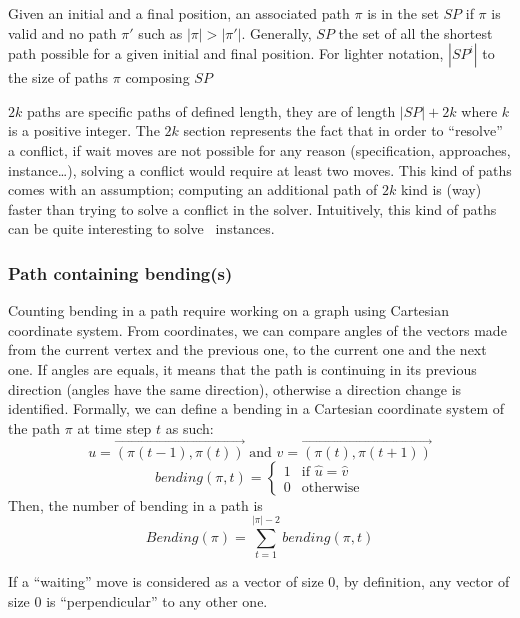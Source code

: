 \begin{definition}\label{def:shortest_path}
  Given an initial and a final position, an associated path \(\pi\) is in the set \(SP\) if \(\pi\) is valid and no path \(\pi'\) such as \(|\pi| > |\pi'|\). Generally, \(SP\) the set of all the shortest path possible for a given initial and final position. For lighter notation, \(|SP^i|\) to the size of  paths \(\pi\) composing \(SP\)
\end{definition}



\(2k\) paths are specific paths of defined length, they are of length \(|SP| + 2k\) where \(k\) is a positive integer. The \(2k\) section represents the fact that in order to ``resolve'' a conflict, if wait moves are not possible for any reason (specification, approaches, instance\ldots), solving a conflict would require at least two moves. This kind of paths comes with an assumption; computing an additional path of \(2k\) kind is (way) faster than trying to solve a conflict in the solver. Intuitively, this kind of paths can be quite interesting to solve~ instances.





\subsubsection{Path containing bending(s)}

Counting bending in a path require working on a graph using Cartesian coordinate system. From coordinates, we can compare angles of the vectors made from the current vertex and the previous one, to the current one and the next one. If angles are equals, it means that the path is continuing in its previous direction (angles have the same direction), otherwise a direction change is identified. Formally, we can define a bending in a Cartesian coordinate system of the path \(\pi\) at time step \(t\) as such: \[
 u = \overrightarrow{(\pi(t-1),\pi(t))} \text{ and  } v = \overrightarrow{(\pi(t),\pi(t+1))}
\]
\[
  bending(\pi,t) = 
    \begin{cases}
      1  & \text{if }  \widehat{u} = \widehat{v} \\
      0  & \text{otherwise}
    \end{cases}  
\] Then, the number of bending in a path is \[
  Bending(\pi) =  \sum_{t=1}^{|\pi|-2}{bending(\pi,t)}
\] 

If a ``waiting'' move is considered as a vector of size 0, by definition, any vector of size 0 is ``perpendicular'' to any other one.

